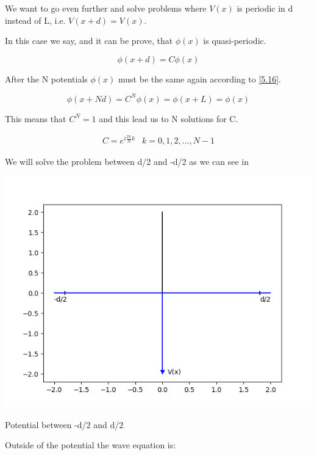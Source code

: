 We want to go even further and solve problems where $V(x)$ is periodic in d instead of L, i.e. $V(x+d)=V(x)$.

In this case we say, and it can be prove, that $\phi(x)$ is quasi-periodic.

\begin{equation}
  \label{5.17}
  \phi(x+d) = C \phi(x)
\end{equation}

After the N potentials $\phi(x)$ must be the same again according to \ref{5.16}.

\begin{equation}
  \label{5.18}
  \phi(x+Nd) = C^N \phi(x) = \phi(x+L) = \phi(x)
\end{equation}

This means that $C^N = 1$ and this lead us to N solutions for C.

\begin{equation}
  \label{5.19}
  \begin{array}{lc}
    C = e^{i\frac{2\pi}{N}k} & k=0,1,2,...,N-1
  \end{array}
\end{equation}

We will solve the problem between d/2 and -d/2 as we can see in 

\begin{marginfigure}
  \includegraphics{images5/quasiperf.png}
  \centering
  \caption{Potential between -d/2 and d/2}
\end{marginfigure}

Outside of the potential the wave equation is:

